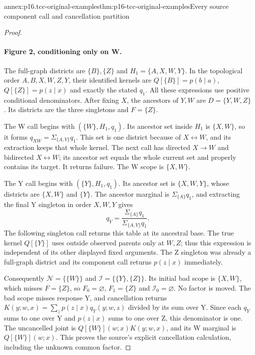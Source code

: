 \begin{annexitem}{annex:p16.tcc-original-examples}{thm:p16-tcc-original-examples}{Every source component call and cancellation partition}
\begin{proof}
\paragraph{Figure 2, conditioning only on W.}
The full-graph districts are \(\{B\},\{Z\}\) and
\(H_1=\{A,X,W,Y\}\). In the topological order
\(A,B,X,W,Z,Y\), their identified kernels are
\(Q[\{B\}]=p(b\mid a)\), \(Q[\{Z\}]=p(z\mid x)\)
and exactly the stated \(q_1\). All these expressions use
positive conditional denominators. After fixing \(X\), the
ancestors of \(Y,W\) are \(D=\{Y,W,Z\}\). Its
districts are the three singletons and \(F=\{Z\}\).

The W call begins with \((\{W\},H_1,q_1)\). Its ancestor
set inside \(H_1\) is \(\{X,W\}\), so it forms
\(q_{XW}=\Sigma_{\{A,Y\}}q_1\). This set is one district
because of \(X\leftrightarrow W\), and its extraction keeps
that whole kernel. The next call has directed \(X\to W\)
and bidirected \(X\leftrightarrow W\); its ancestor set
equals the whole current set and properly contains its target.
It returns failure. The W scope is \(\{X,W\}\).

The Y call begins with \((\{Y\},H_1,q_1)\). Its ancestor
set is \(\{X,W,Y\}\), whose districts are \(\{X,W\}\)
and \(\{Y\}\). The ancestor marginal is
\(\Sigma_{\{A\}}q_1\), and extracting the final Y singleton
in order \(X,W,Y\) gives
\[
 q_Y=\frac{\Sigma_{\{A\}}q_1}{\Sigma_{\{A,Y\}}q_1}.
\]
The following singleton call returns this table at its ancestral
base. The true kernel \(Q[\{Y\}]\) uses outside observed
parents only at \(W,Z\); thus this expression is independent
of its other displayed fixed arguments. The Z singleton was
already a full-graph district and its component call returns
\(p(z\mid x)\) immediately.

Consequently \(\mathcal N=\{\{W\}\}\) and
\(\mathcal I=\{\{Y\},\{Z\}\}\). Its initial bad scope
is \(\{X,W\}\), which misses \(F=\{Z\}\), so
\(F_0=\varnothing\), \(F_1=\{Z\}\) and
\(\mathcal I_0=\varnothing\). No factor is moved. The
bad scope misses response Y, and cancellation returns
\(K(y;w,x)=\sum_z p(z\mid x)q_Y(y;w,z)\) divided by
its sum over Y. Since each \(q_Y\) sums to one over Y
and \(p(z\mid x)\) sums to one over Z, this denominator
is one. The uncancelled joint is
\(Q[\{W\}](w;x)K(y;w,x)\), and its W marginal is
\(Q[\{W\}](w;x)\). This proves the source's explicit
cancellation calculation, including the unknown common factor.


\end{proof}
\end{annexitem}
